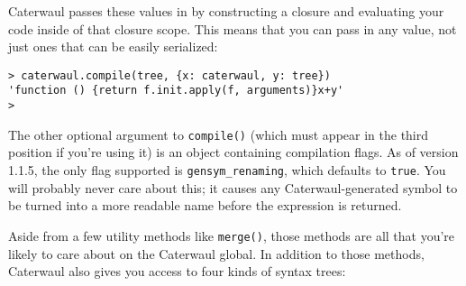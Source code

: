 \documentclass{report}
\begin{document}
\begin{enumerate}
  Caterwaul passes these values in by constructing a closure and evaluating your code inside of that closure scope. This means that you can pass in any value, not just ones that can be
  easily serialized:

\begin{verbatim}
> caterwaul.compile(tree, {x: caterwaul, y: tree})
'function () {return f.init.apply(f, arguments)}x+y'
>
\end{verbatim}

  The other optional argument to {\tt compile()} (which must appear in the third position if you're using it) is an object containing compilation flags. As of version 1.1.5, the only flag
  supported is \verb|gensym_renaming|, which defaults to {\tt true}. You will probably never care about this; it causes any Caterwaul-generated symbol to be turned into a more readable
  name before the expression is returned.
\end{enumerate}

  Aside from a few utility methods like {\tt merge()}, those methods are all that you're likely to care about on the Caterwaul global. In addition to those methods, Caterwaul also gives you
  access to four kinds of syntax trees:
\end{document}
